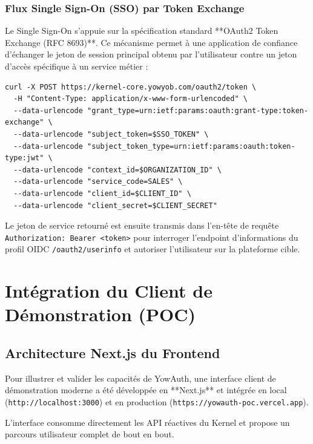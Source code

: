 \documentclass[11pt,a4paper,oneside]{report}
\newcommand{\code}[1]{\texttt{\small #1}}
\begin{document}
\subsection{Flux Single Sign-On (SSO) par Token Exchange}
Le Single Sign-On s'appuie sur la spécification standard **OAuth2 Token Exchange (RFC 8693)**. Ce mécanisme permet à une application de confiance d'échanger le jeton de session principal obtenu par l'utilisateur contre un jeton d'accès spécifique à un service métier :
\begin{lstlisting}[caption={Payload d'échange auprès de /oauth2/token}]
curl -X POST https://kernel-core.yowyob.com/oauth2/token \
  -H "Content-Type: application/x-www-form-urlencoded" \
  --data-urlencode "grant_type=urn:ietf:params:oauth:grant-type:token-exchange" \
  --data-urlencode "subject_token=$SSO_TOKEN" \
  --data-urlencode "subject_token_type=urn:ietf:params:oauth:token-type:jwt" \
  --data-urlencode "context_id=$ORGANIZATION_ID" \
  --data-urlencode "service_code=SALES" \
  --data-urlencode "client_id=$CLIENT_ID" \
  --data-urlencode "client_secret=$CLIENT_SECRET"
\end{lstlisting}
Le jeton de service retourné est ensuite transmis dans l'en-tête de requête \code{Authorization: Bearer <token>} pour interroger l'endpoint d'informations du profil OIDC \code{/oauth2/userinfo} et autoriser l'utilisateur sur la plateforme cible.

\chapter{Intégration du Client de Démonstration (POC)}

\section{Architecture Next.js du Frontend}
Pour illustrer et valider les capacités de YowAuth, une interface client de démonstration moderne a été développée en **Next.js** et intégrée en local (\code{http://localhost:3000}) et en production (\code{https://yowauth-poc.vercel.app}).

L'interface consomme directement les API réactives du Kernel et propose un parcours utilisateur complet de bout en bout.
\end{document}
